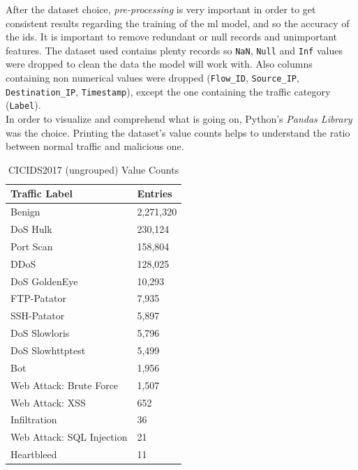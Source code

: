 After the dataset choice, \textit{pre-processing} is very important in order to get consistent results regarding the training of the \gls{ml} model, and so the accuracy of the \gls{ids}. It is important to remove redundant or null records and unimportant features. The dataset used contains plenty records so \texttt{NaN}, \texttt{Null} and \texttt{Inf} values were dropped to clean the data the model will work with. Also columns containing non numerical values were dropped (\texttt{Flow\_ID}, \texttt{Source\_IP}, \texttt{Destination\_IP}, \texttt{Timestamp}), except the one containing the traffic category (\texttt{Label}). \\ In order to visualize and comprehend what is going on, Python's \textit{Pandas Library} \cite{PandasLibrary} was the choice. Printing the dataset's value counts helps to understand the ratio between normal traffic and malicious one. 

\begin{table}[h!]
    \centering
    \begin{tabular}{l|l}
        \toprule 
        Traffic Label & Entries \\
        \midrule
        \rowcolor{black!10} Benign & 2,271,320 \\
        DoS Hulk & 230,124 \\
        \rowcolor{black!10} Port Scan & 158,804 \\
        DDoS & 128,025 \\
        \rowcolor{black!10} DoS GoldenEye & 10,293 \\
        FTP-Patator & 7,935 \\
        \rowcolor{black!10} SSH-Patator & 5,897 \\
        DoS Slowloris & 5,796 \\
        \rowcolor{black!10} DoS Slowhttptest & 5,499 \\
        Bot & 1,956 \\
        \rowcolor{black!10} Web Attack: Brute Force & 1,507 \\
        Web Attack: XSS & 652 \\
        \rowcolor{black!10} Infiltration & 36 \\
        Web Attack: SQL Injection & 21 \\
        \rowcolor{black!10} Heartbleed & 11 \\
        \bottomrule
    \end{tabular}
    \caption{CICIDS2017 (ungrouped) Value Counts}
    \label{tab:dataset-distribution}
\end{table}


